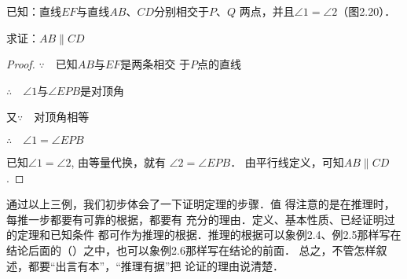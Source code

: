 \begin{example}
	已知：直线$EF$与直线$AB$、$CD$分别相交于$P$、$Q$
两点，并且$\angle 1=\angle 2$（图2.20）．

求证：$AB\parallel CD$
\end{example}

\begin{figure}[htp]
	\centering
{}
	\caption{}
\end{figure}
	

\begin{proof}
$\because\quad $已知$AB$与$EF$是两条相交
于$P$点的直线

$\therefore\quad \angle 1$与$\angle EPB$是对顶角

又$\because\quad $对顶角相等

$\therefore\quad \angle 1=\angle EPB$

已知$\angle 1=\angle 2$, 由等量代换，就有
$\angle 2=\angle EPB$．
由平行线定义，可知$AB\parallel CD$.
\end{proof}

通过以上三例，我们初步体会了一下证明定理的步骤．值
得注意的是在推理时，每推一步都要有可靠的根据，都要有
充分的理由．定义、基本性质、已经证明过的定理和已知条件
都可作为推理的根据．推理的根据可以象例2.4、例2.5那样写在
结论后面的（\qquad）之中，也可以象例2.6那样写在结论的前面．
总之，不管怎样叙述，都要“出言有本”，“推理有据”把
论证的理由说清楚．


